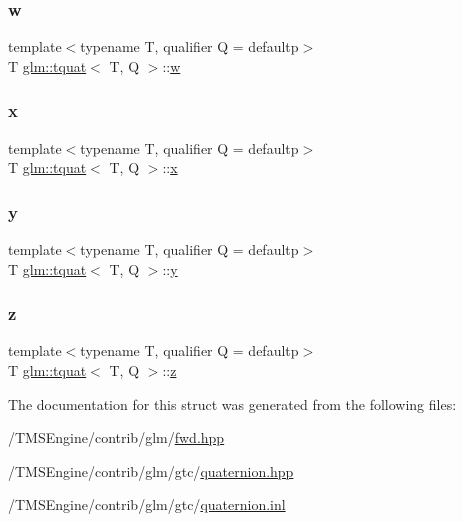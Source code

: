 \subsubsection{\texorpdfstring{w}{w}}
{\footnotesize\ttfamily template$<$typename T, qualifier Q = defaultp$>$ \\
T \hyperlink{structglm_1_1tquat}{glm\+::tquat}$<$ T, Q $>$\+::\hyperlink{_s_d_l__opengl__glext_8h_a6ee8f168a7ab6785a9bb57c6715dad99}{w}}

\mbox{\label{structglm_1_1tquat_a74fac4f3deda35413106feeae734641c}} 
\subsubsection{\texorpdfstring{x}{x}}
{\footnotesize\ttfamily template$<$typename T, qualifier Q = defaultp$>$ \\
T \hyperlink{structglm_1_1tquat}{glm\+::tquat}$<$ T, Q $>$\+::\hyperlink{_s_d_l__opengl_8h_ad0e63d0edcdbd3d79554076bf309fd47}{x}}

\mbox{\label{structglm_1_1tquat_a09c876d49b2406fd50aca892f3637f0f}} 
\subsubsection{\texorpdfstring{y}{y}}
{\footnotesize\ttfamily template$<$typename T, qualifier Q = defaultp$>$ \\
T \hyperlink{structglm_1_1tquat}{glm\+::tquat}$<$ T, Q $>$\+::\hyperlink{_s_d_l__opengl_8h_a1675d9d7bb68e1657ff028643b4037e3}{y}}

\mbox{\label{structglm_1_1tquat_a81cfe33795e56627715972ad533605d4}} 
\subsubsection{\texorpdfstring{z}{z}}
{\footnotesize\ttfamily template$<$typename T, qualifier Q = defaultp$>$ \\
T \hyperlink{structglm_1_1tquat}{glm\+::tquat}$<$ T, Q $>$\+::\hyperlink{_s_d_l__opengl__glext_8h_a5e74030ebb3297ce1b37ff716fedd68f}{z}}



The documentation for this struct was generated from the following files\+:\begin{DoxyCompactItemize}
\item 
/\+T\+M\+S\+Engine/contrib/glm/\hyperlink{fwd_8hpp}{fwd.\+hpp}\item 
/\+T\+M\+S\+Engine/contrib/glm/gtc/\hyperlink{gtc_2quaternion_8hpp}{quaternion.\+hpp}\item 
/\+T\+M\+S\+Engine/contrib/glm/gtc/\hyperlink{gtc_2quaternion_8inl}{quaternion.\+inl}\end{DoxyCompactItemize}
